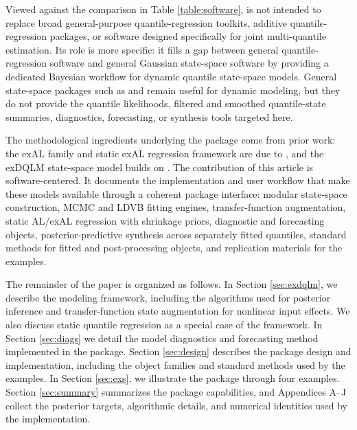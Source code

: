 \documentclass{jss}
\begin{document}
Viewed against the comparison in Table \ref{table:software},  is not intended to replace broad general-purpose quantile-regression toolkits, additive quantile-regression packages, or software designed specifically for joint multi-quantile estimation. Its role is more specific: it fills a gap between general quantile-regression software and general Gaussian state-space software by providing a dedicated Bayesian workflow for dynamic quantile state-space models. General state-space packages such as  \citep{dlm} and  \citep{dynr} remain useful for dynamic modeling, but they do not provide the quantile likelihoods, filtered and smoothed quantile-state summaries, diagnostics, forecasting, or synthesis tools targeted here.

The methodological ingredients underlying the package come from prior work: the exAL family and static exAL regression framework are due to \citet{yan2025family}, and the exDQLM state-space model builds on \citet{me}. The contribution of this article is software-centered. It documents the  implementation and user workflow that make these models available through a coherent package interface: modular state-space construction, MCMC and LDVB fitting engines, transfer-function augmentation, static AL/exAL regression with shrinkage priors, diagnostic and forecasting objects, posterior-predictive synthesis across separately fitted quantiles, standard methods for fitted and post-processing objects, and replication materials for the examples.

The remainder of the paper is organized as follows. In Section \ref{sec:exdqlm}, we describe the modeling framework, including the algorithms used for posterior inference and transfer-function state augmentation for nonlinear input effects. We also discuss static quantile regression as a special case of the framework. In Section \ref{sec:diags} we detail the model diagnostics and forecasting method implemented in the package. Section \ref{sec:design} describes the package design and implementation, including the object families and standard methods used by the examples. In Section \ref{sec:exs}, we illustrate the package through four examples. Section \ref{sec:summary} summarizes the package capabilities, and Appendices A--J collect the posterior targets, algorithmic details, and numerical identities used by the implementation.


\end{document}
